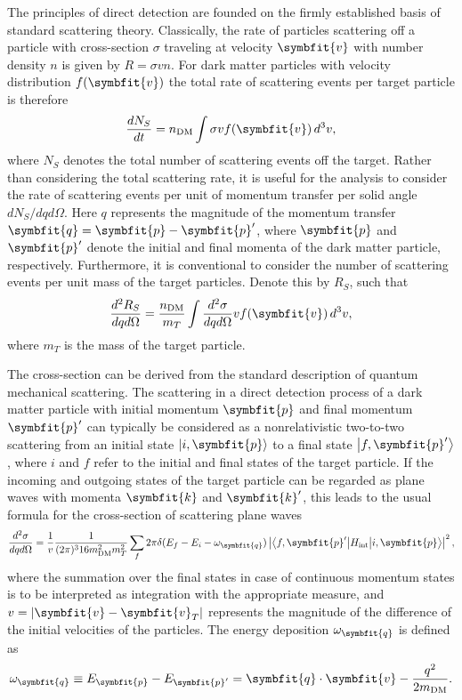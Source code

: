 \documentclass[b5paper, 10pt, twoside]{book}
\renewcommand{\vec}[1]{\symbfit{#1}}
\newcommand{\der}[2]{\frac{d#1}{d#2}}
\newcommand{\ddder}[3]{\frac{d^2#1}{d#2d#3}}
\newcommand{\difd}{\,d}
\newcommand{\ket}[1]{\left|#1\right\rangle}
\newcommand{\brakett}[3]{\left\langle#1\middle|#2\middle|#3\right\rangle}
\begin{document}
The principles of direct detection are founded on the firmly established basis of standard scattering theory. Classically, the rate of particles scattering off a particle with cross-section $\sigma$ traveling at velocity $\vec{v}$ with number density $n$ is given by $R=\sigma vn$. For dark matter particles with velocity distribution $f(\vec{v})$ the total rate of scattering events per target particle is therefore
\begin{equation}
\der{N_S}{t}=n_\text{DM}\int\sigma vf(\vec{v})\difd^3v,
\end{equation}
where $N_S$ denotes the total number of scattering events off the target. Rather than considering the total scattering rate, it is useful for the analysis to consider the rate of scattering events per unit of momentum transfer per solid angle $dN_S/dqd\Omega$. Here $q$ represents the magnitude of the momentum transfer $\vec{q}=\vec{p}-\vec{p}'$, where $\vec{p}$ and $\vec{p}'$ denote the initial and final momenta of the dark matter particle, respectively. Furthermore, it is conventional to consider the number of scattering events per unit mass of the target particles. Denote this by $R_S$, such that
\begin{equation}
\ddder{R_S}{q}{\Omega}=\frac{n_\text{DM}}{m_T}\int\ddder{\sigma}{q}{\Omega}vf(\vec{v})\difd^3{v},
\end{equation}
where $m_T$ is the mass of the target particle.

The cross-section can be derived from the standard description of quantum mechanical scattering. The scattering in a direct detection process of a dark matter particle with initial momentum $\vec{p}$ and final momentum $\vec{p}'$ can typically be considered as a nonrelativistic two-to-two scattering from an initial state $\ket{i,\vec{p}}$ to a final state $\ket{f,\vec{p}'}$, where $i$ and $f$ refer to the initial and final states of the target particle. If the incoming and outgoing states of the target particle can be regarded as plane waves with momenta $\vec{k}$ and $\vec{k}'$, this leads to the usual formula for the cross-section of scattering plane waves
\begin{equation}
\ddder{\sigma}{q}{\Omega}=\frac{1}{v}\frac{1}{(2\pi)^3 16m_\text{DM}^2m_T^2}\sum_f2\pi\delta(E_f-E_i-\omega_{\vec{q}})\left|\brakett{f,\vec{p}'}{H_\text{int}}{i,\vec{p}}\right|^2,
\end{equation}
where the summation over the final states in case of continuous momentum states is to be interpreted as integration with the appropriate measure, and $v=|\vec{v}-\vec{v}_T|$ represents the magnitude of the difference of the initial velocities of the particles. The energy deposition $\omega_{\vec{q}}$ is defined as
\begin{equation}
\omega_{\vec{q}}\equiv E_{\vec{p}}-E_{\vec{p}'}=\vec{q}\cdot\vec{v}-\frac{q^2}{2m_\text{DM}}.
\end{equation}
\end{document}
